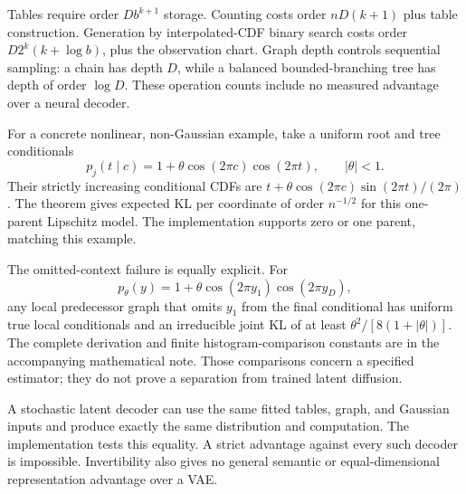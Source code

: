 \documentclass[11pt]{article}
\begin{document}
Tables require order $Db^{k+1}$ storage. Counting costs order $nD(k+1)$ plus table construction. Generation by interpolated-CDF binary search costs order $D2^k(k+\log b)$, plus the observation chart. Graph depth controls sequential sampling: a chain has depth $D$, while a balanced bounded-branching tree has depth of order $\log D$. These operation counts include no measured advantage over a neural decoder.

For a concrete nonlinear, non-Gaussian example, take a uniform root and tree conditionals
\begin{equation}
 p_j(t\mid c)=1+\theta\cos(2\pi c)\cos(2\pi t),\qquad |\theta|<1.
\end{equation}
Their strictly increasing conditional CDFs are
$t+\theta\cos(2\pi c)\sin(2\pi t)/(2\pi)$. The theorem gives expected KL per coordinate of order $n^{-1/2}$ for this one-parent Lipschitz model. The implementation supports zero or one parent, matching this example.

The omitted-context failure is equally explicit. For
\begin{equation}
 p_\theta(y)=1+\theta\cos(2\pi y_1)\cos(2\pi y_D),
\end{equation}
any local predecessor graph that omits $y_1$ from the final conditional has uniform true local conditionals and an irreducible joint KL of at least $\theta^2/[8(1+|\theta|)]$. The complete derivation and finite histogram-comparison constants are in the accompanying mathematical note. Those comparisons concern a specified estimator; they do not prove a separation from trained latent diffusion.

A stochastic latent decoder can use the same fitted tables, graph, and Gaussian inputs and produce exactly the same distribution and computation. The implementation tests this equality. A strict advantage against every such decoder is impossible. Invertibility also gives no general semantic or equal-dimensional representation advantage over a VAE.
\end{document}
